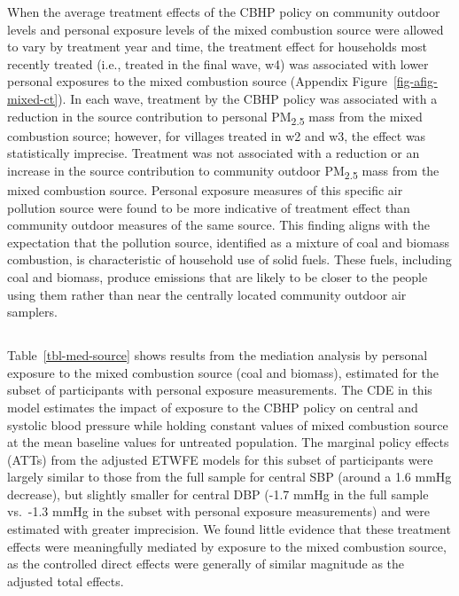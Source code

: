 \documentclass[
  letterpaper,
  DIV=11,
  numbers=noendperiod]{scrartcl}
\providecommand{\DIFaddtex}[1]{{\protect\color{blue}\uwave{#1}}} %
\providecommand{\DIFaddbegin}{} %
\providecommand{\DIFaddend}{} %
\providecommand{\DIFdelbegin}{} %
\providecommand{\DIFdelend}{} %
\providecommand{\DIFadd}[1]{\texorpdfstring{\DIFaddtex{#1}}{#1}} %
\newcommand{\DIFscaledelfig}{0.5}
\newlength{\DIFdelgraphicswidth} %
\newlength{\DIFdelgraphicsheight} %
\newcommand{\DIFaddincludegraphics}[2][]{{\color{blue}\fbox{\DIFOincludegraphics[#1]{#2}}}} %
\newcommand{\DIFdelincludegraphics}[2][]{%
\sbox{\DIFdelgraphicsbox}{\DIFOincludegraphics[#1]{#2}}%
\settoboxwidth{\DIFdelgraphicswidth}{\DIFdelgraphicsbox} %
\settoboxtotalheight{\DIFdelgraphicsheight}{\DIFdelgraphicsbox} %
\scalebox{\DIFscaledelfig}{%
\parbox[b]{\DIFdelgraphicswidth}{\usebox{\DIFdelgraphicsbox}\\[-\baselineskip] \rule{\DIFdelgraphicswidth}{0em}}\llap{\resizebox{\DIFdelgraphicswidth}{\DIFdelgraphicsheight}{%
\setlength{\unitlength}{\DIFdelgraphicswidth}%
\begin{picture}(1,1)%
\thicklines\linethickness{2pt} %
{\color[rgb]{1,0,0}\put(0,0){\framebox(1,1){}}}%
{\color[rgb]{1,0,0}\put(0,0){\line( 1,1){1}}}%
{\color[rgb]{1,0,0}\put(0,1){\line(1,-1){1}}}%
\end{picture}%
}\hspace*{3pt}}} %
} %
\DeclareRobustCommand{\DIFaddbegin}{\DIFOaddbegin \let\includegraphics\DIFaddincludegraphics} %
\DeclareRobustCommand{\DIFaddend}{\DIFOaddend \let\includegraphics\DIFOincludegraphics} %
\DeclareRobustCommand{\DIFdelbegin}{\DIFOdelbegin \let\includegraphics\DIFdelincludegraphics} %
\DeclareRobustCommand{\DIFdelend}{\DIFOaddend \let\includegraphics\DIFOincludegraphics} %
\begin{document}
When the average treatment effects of the CBHP policy on community
outdoor levels and personal exposure levels of the mixed combustion
source were allowed to vary by treatment year and time, the treatment
effect for households most recently treated (i.e., treated in the final
wave, w4) was associated with lower personal exposures to the mixed
combustion source (Appendix Figure~\ref{fig-afig-mixed-ct}). In each
wave, treatment by the CBHP policy was associated with a reduction in
the source contribution to personal PM\textsubscript{2.5} mass from the
mixed combustion source; however, for villages treated in w2 and w3, the
effect was statistically imprecise. Treatment was not associated with a
reduction or an increase in the source contribution to community outdoor
PM\textsubscript{2.5} mass from the mixed combustion source. Personal
exposure measures of this specific air pollution source were found to be
more indicative of treatment effect than community outdoor measures of
the same source. This finding aligns with the expectation that the
pollution source, identified as a mixture of coal and biomass
combustion, is characteristic of household use of solid fuels. These
fuels, including coal and biomass, produce emissions that are likely to
be closer to the people using them rather than near the centrally
located community outdoor air samplers.

\DIFdelbegin %
\DIFdelend \DIFaddbegin \subsection{\DIFadd{Aim 3: Mediation by source
contribution}}\label{aim-3-mediation-by-source-contribution}
\DIFaddend 

Table~\ref{tbl-med-source} shows results from the mediation analysis by
personal exposure to the mixed combustion source (coal and biomass),
estimated for the subset of participants with personal exposure
measurements. The CDE in this model estimates the impact of exposure to
the CBHP policy on central and systolic blood pressure while holding
constant values of mixed combustion source at the mean baseline values
for untreated population. The marginal policy effects (ATTs) from the
adjusted ETWFE models for this subset of participants were largely
similar to those from the full sample for central SBP (around a 1.6 mmHg
decrease), but slightly smaller for central DBP (-1.7 mmHg in the full
sample vs.~-1.3 mmHg in the subset with personal exposure measurements)
and were estimated with greater imprecision. We found little evidence
that these treatment effects were meaningfully mediated by exposure to
the mixed combustion source, as the controlled direct effects were
generally of similar magnitude as the adjusted total effects.
\end{document}
